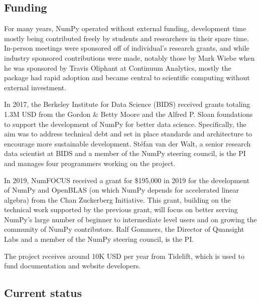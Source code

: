 \documentclass[fleqn,10pt]{wlscirep}
\begin{document}
\subsection*{Funding}

For many years, NumPy operated without external funding, development
time mostly being contributed freely by students and researchers in
their spare time.  In-person meetings were sponsored off of
individual's research grants, and while industry sponsored
contributions were made, notably those by Mark Wiebe when he was
sponsored by Travis Oliphant at Continuum Analytics, mostly the
package had rapid adoption and became central to scientific computing
without external investment.


In 2017, the Berkeley Institute for Data Science
(BIDS) received grants totaling 1.3M USD from the Gordon \& Betty
Moore and the Alfred P. Sloan foundations to support the development
of NumPy for better data science.
Specifically, the aim was to address technical debt and set in place
standards and architecture to encourage more sustainable development.
Stéfan van der Walt, a senior research data scientist at BIDS and a
member of the NumPy steering council, is the PI and manages four
programmers working on the project.


In 2019, NumFOCUS received a grant for \$195,000 in 2019 for the
development of NumPy and OpenBLAS (on which NumPy depends for
accelerated linear algebra) from the Chan Zuckerberg Initiative.
This grant, building on the technical work supported by the previous
grant, will focus on better serving NumPy's large number of beginner
to intermediate level users and on growing the community of NumPy
contributors.
Ralf Gommers, the Director of Quansight Labs and a member of the NumPy
steering council, is the PI.

The project receives around 10K USD per year from Tidelift, which is
used to fund documentation and website developers.

\subsection*{Current status}
\end{document}
